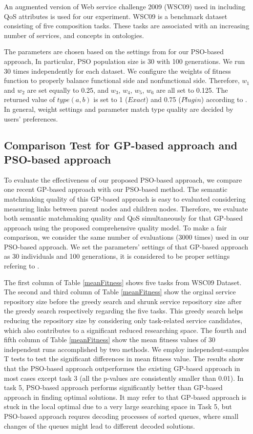 \documentclass{llncs}
\begin{document}
An augmented version of Web service challenge 2009 (WSC09) used in \cite{ma2015hybrid,da2016genetic} including QoS attributes is used for our experiment. WSC09 is a benchmark dataset consisting of five composition tasks. These tasks are associated with an increasing number of services, and concepts in ontologies. 

The parameters are chosen based on the settings from \cite{shi2001particle} for our PSO-based approach, In particular, PSO population size is 30 with 100 generations. We run 30 times independently for each dataset. We configure the weights of fitness function to properly balance functional side and nonfunctional side. Therefore, $w_{1}$ and $w_{2}$ are set equally to 0.25, and $w_{3}$, $w_{4}$, $w_{5}$, $w_{6}$ are all set to 0.125. The returned value of $type(a,b)$ is set to 1 ($Exact$) and 0.75 ($Plugin$) according to \cite{lecue2009optimizing}. In general, weight settings and parameter match type quality are decided by users' preferences.

\subsection{Comparison Test for GP-based approach and PSO-based approach}\label{comparisonTestWithGP}
To evaluate the effectiveness of our proposed PSO-based approach, we compare one recent GP-based approach \cite{ma2015hybrid} with our PSO-based method. The semantic matchmaking quality of this GP-based approach is easy to evaluated considering measuring links between parent nodes and children nodes. Therefore, we evaluate both semantic matchmaking quality and QoS simultaneously for that GP-based approach using the proposed comprehensive quality model. To make a fair comparison, we consider the same number of evaluations (3000 times) used in our PSO-based approach. We set the parameters' settings of that GP-based approach as 30 individuals and 100 generations, it is considered to be proper settings refering to \cite{da2015gp}.

The first column of Table \ref{meanFitness} shows five tasks from WSC09 Dataset. The second and third column of Table \ref{meanFitness} show the orginal service repository size before the greedy search and shrunk service repository size after the greedy search respectively regarding the five tasks. This greedy search helps reducing the repository size by considering only task-related service candidates, which also contributes to a significant reduced researching space. The fourth and fifth column of Table \ref{meanFitness} show the mean fitness values of 30 independent runs accomplished by two methods. We employ independent-samples T tests to test the significant differences in mean fitness value. The results show that the PSO-based approach outperformes the existing GP-based approach in most cases except task 3 (all the p-values are consistently smaller than 0.01). In task 5, PSO-based approach performs significantly better than GP-based approach in finding optimal solutions. It may refer to that GP-based approach is stuck in the local optimal due to a very large searching space in Task 5, but PSO-based approach requres decoding processes of sorted queues, where small changes of the queues might lead to different decoded solutions.
\end{document}
